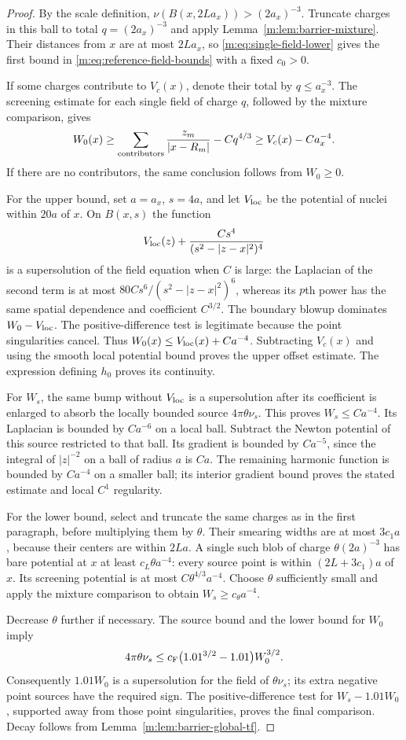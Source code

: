 \begin{proof}
By the scale definition,
$\nu(B(x,2La_x))>(2a_x)^{-3}$.  Truncate charges in this ball to total
$q=(2a_x)^{-3}$ and apply Lemma~\ref{m:lem:barrier-mixture}.  Their distances
from $x$ are at most $2La_x$, so
\eqref{m:eq:single-field-lower} gives the first bound in
\eqref{m:eq:reference-field-bounds} with a fixed $c_0>0$.

If some charges contribute to $V_c(x)$, denote their total by
$q\le a_x^{-3}$.  The screening estimate for each single field of
charge $q$, followed by the mixture comparison, gives
\[
 W_0(x)\ge\sum_{\rm contributors}\frac{z_m}{|x-R_m|}-Cq^{4/3}
          \ge V_c(x)-Ca_x^{-4}.
\]
If there are no contributors, the same conclusion follows from
$W_0\ge0$.

For the upper bound, set $a=a_x$, $s=4a$, and let $V_{\rm loc}$ be the
potential of nuclei within $20a$ of $x$.  On $B(x,s)$ the function
\[
 V_{\rm loc}(z)+\frac{C s^4}{(s^2-|z-x|^2)^4}
\]
is a supersolution of the field equation when $C$ is large: the
Laplacian of the second term is at most
$80Cs^6/(s^2-|z-x|^2)^6$, whereas its $p$th power has the same
spatial dependence and coefficient $C^{3/2}$.  The boundary blowup
dominates $W_0-V_{\rm loc}$.  The positive-difference test is legitimate
because the point singularities cancel.  Thus
$W_0(x)\le V_{\rm loc}(x)+Ca^{-4}$.  Subtracting $V_c(x)$ and using
the smooth local potential bound proves the upper offset estimate.
The expression defining $h_0$ proves its continuity.

For $W_s$, the same bump without $V_{\rm loc}$ is a supersolution after
its coefficient is enlarged to absorb the locally bounded source
$4\pi\theta\nu_s$.  This proves $W_s\le Ca^{-4}$.  Its Laplacian is
bounded by $Ca^{-6}$ on a local ball.  Subtract the Newton potential
of this source restricted to that ball.  Its gradient is bounded by
$Ca^{-5}$, since the integral of $|z|^{-2}$ on a ball of radius $a$ is
$Ca$.  The remaining harmonic function is bounded by $Ca^{-4}$ on a
smaller ball; its interior gradient bound proves the stated estimate
and local $C^1$ regularity.

For the lower bound, select and truncate the same charges as in the
first paragraph, before multiplying them by $\theta$.  Their smearing
widths are at most $3c_1a$, because their centers are within $2La$.
A single such blob of charge $\theta(2a)^{-3}$ has bare potential at
$x$ at least $c_L\theta a^{-4}$: every source point is within
$(2L+3c_1)a$ of $x$.  Its screening potential is at most
$C\theta^{4/3}a^{-4}$.  Choose $\theta$ sufficiently small and apply
the mixture comparison to obtain $W_s\ge c_\theta a^{-4}$.

Decrease $\theta$ further if necessary.  The source bound and the lower
bound for $W_0$ imply
\[
 4\pi\theta\nu_s
   \le c_{\mathrm F}\bigl(1.01^{3/2}-1.01\bigr)W_0^{3/2}.
\]
Consequently $1.01W_0$ is a supersolution for the field of
$\theta\nu_s$; its extra negative point sources have the required
sign.  The positive-difference test for $W_s-1.01W_0$, supported away
from those point singularities, proves the final comparison.
Decay follows from Lemma~\ref{m:lem:barrier-global-tf}.
\end{proof}

